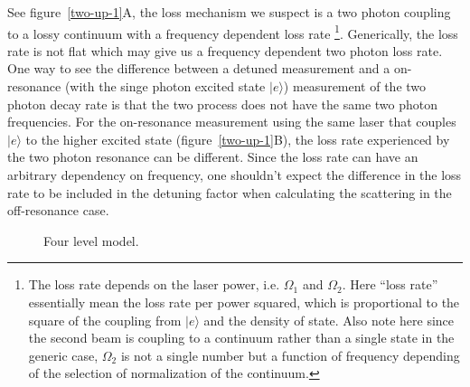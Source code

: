 \documentclass[10pt,fleqn]{article}
\begin{document}
See \mbox{figure \ref{two-up-1}A}, the loss mechanism we suspect is a two photon coupling
to a lossy continuum with a frequency dependent loss rate
\footnote{The loss rate depends on the laser power, i.e. $\Omega_1$ and $\Omega_2$. Here
  ``loss rate'' essentially mean the loss rate per power squared, which is proportional to
  the square of the coupling from $|e\rangle$ and the density of state.
  Also note here since the second beam is coupling to a continuum rather than a single state
  in the generic case, $\Omega_2$ is not a single number but a function of frequency
  depending of the selection of normalization of the continuum.}.
Generically, the loss rate is not flat which may give us a frequency dependent
two photon loss rate. One way to see the difference between a detuned measurement
and a on-resonance (with the singe photon excited state $|e\rangle$)
measurement of the two photon decay rate is that the two process does not have the same
two photon frequencies. For the on-resonance measurement using the same laser that couples
$|e\rangle$ to the higher excited state (\mbox{figure \ref{two-up-1}B}),
the loss rate experienced by the two photon resonance can be different.
Since the loss rate can have an arbitrary dependency on frequency, one shouldn't expect
the difference in the loss rate to be included in the detuning factor when calculating
the scattering in the off-resonance case.\\

\begin{wrapfigure}{R}{5cm}
  \begin{center}
  \end{center}
  \caption{Four level model.}
  \label{two-up-2}
\end{wrapfigure}
\end{document}
